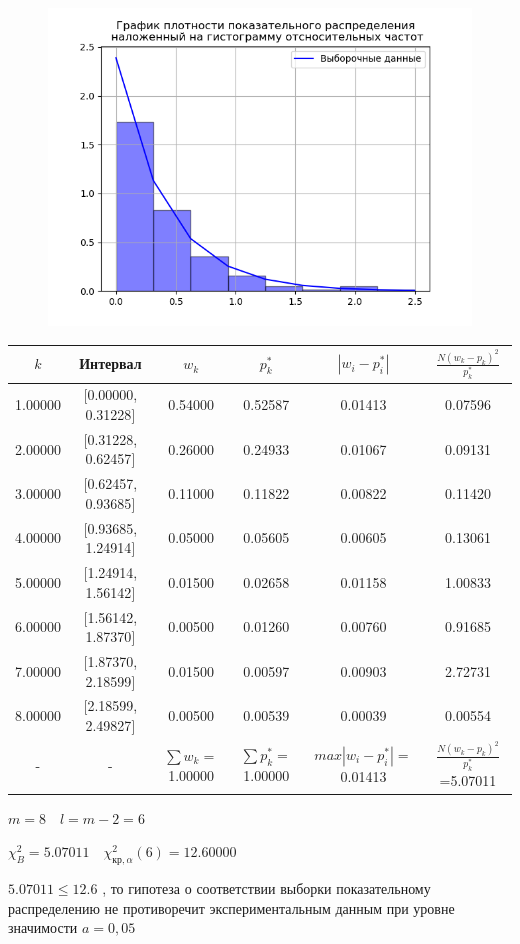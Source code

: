 \begin{figure}%
\centering%
\includegraphics[width=1.0\textwidth]{../latex/inc/generated/img/relFreqDensity2.png}%
\end{figure}

%
\begin{changemargin}{-4cm}{0cm}\small{%
\begin{tabular}{|c|c|c|c|c|c|}%
\hline%
$k$&Интервал&$w_k$&$p_{k}^*$&$|w_i-p_{i}^*|$&$\frac{N(w_k - p_k)^2}{p_{k}^*}$\\%
\hline%
1.00000&{[}0.00000, 0.31228{]}&0.54000&0.52587&0.01413&0.07596\\%
\hline%
2.00000&{[}0.31228, 0.62457{]}&0.26000&0.24933&0.01067&0.09131\\%
\hline%
3.00000&{[}0.62457, 0.93685{]}&0.11000&0.11822&0.00822&0.11420\\%
\hline%
4.00000&{[}0.93685, 1.24914{]}&0.05000&0.05605&0.00605&0.13061\\%
\hline%
5.00000&{[}1.24914, 1.56142{]}&0.01500&0.02658&0.01158&1.00833\\%
\hline%
6.00000&{[}1.56142, 1.87370{]}&0.00500&0.01260&0.00760&0.91685\\%
\hline%
7.00000&{[}1.87370, 2.18599{]}&0.01500&0.00597&0.00903&2.72731\\%
\hline%
8.00000&{[}2.18599, 2.49827{]}&0.00500&0.00539&0.00039&0.00554\\%
\hline%
{-}&{-}&$\sum w_k=$1.00000&$\sum p_{k}^*=$1.00000&$max | w_i - p_{i}^*|=$0.01413&$\frac{N(w_k - p_k)^2}{p_{k}^*}$=5.07011\\%
\hline%
\end{tabular}%
\newline%
\newline%
%
}\end{changemargin}%
$m=8 \quad l=m-2=6$

%
$\chi_{B}^2 = 5.07011 \quad \chi^2_{\text{кр}, \alpha}(6) = 12.60000$

%
$5.07011 \le 12.6$%
, то гипотеза о соответствии выборки показательному распределению не противоречит экспериментальным данным при уровне значимости $a=0,05$